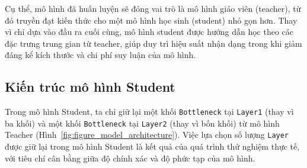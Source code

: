 Cụ thể, mô hình đã huấn luyện sẽ đóng vai trò là mô hình giáo viên (teacher), từ đó truyền đạt kiến thức cho một mô hình học sinh (student) nhỏ gọn hơn. Thay vì chỉ dựa vào đầu ra cuối cùng, mô hình student được hướng dẫn học theo các đặc trưng trung gian từ teacher, giúp duy trì hiệu suất nhận dạng trong khi giảm đáng kể kích thước và chi phí suy luận của mô hình.

\subsection{Kiến trúc mô hình Student}
%
%
Trong mô hình Student, ta chỉ giữ lại một khối \texttt{Bottleneck} tại \texttt{Layer1} (thay vì ba khối) và một khối \texttt{Bottleneck} tại \texttt{Layer2} (thay vì bốn khối) từ mô hình Teacher (Hình~\ref{fig:figure_model_architecture}).
%
Việc lựa chọn số lượng \texttt{Layer} được giữ lại trong mô hình Student là kết quả của quá trình thử nghiệm thực tế, với tiêu chí cân bằng giữa độ chính xác và độ phức tạp của mô hình.

